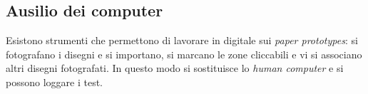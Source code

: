 \subsection{Ausilio dei computer}
Esistono strumenti che permettono di lavorare in digitale sui \textit{paper prototypes}: si fotografano i disegni e si importano, si marcano le zone cliccabili e vi si associano altri disegni fotografati. In questo modo si sostituisce lo \textit{human computer} e si possono loggare i test.